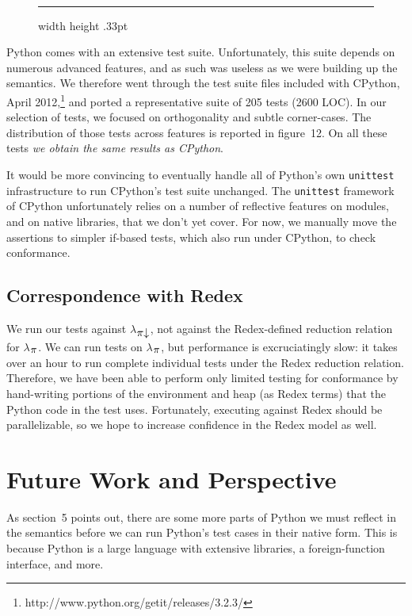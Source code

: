 \documentclass[10pt]{sigplanconf}
\newcommand{\sectionNewpage}{}
\newcommand{\ChapRef}[2]{\SecRef{#1}{#2}}
\newcommand{\SecRef}[2]{section~#1}
\newcommand{\ChapRefLocal}[3]{\ChapRef{#2}{#3}}
\newcommand{\Scribtexttt}[1]{{\texttt{#1}}}
\newcommand{\textsub}[1]{$_{\hbox{\textsmaller{#1}}}$}
\newcommand{\Larger}[1]{\textlarger{#1}}
\let\SOriginalthesubsection\thesubsection
\let\SOriginalthesubsubsection\thesubsubsection
\newcommand{\Ssection}[2]{\section[#1]{#2}\let\thesubsection\SOriginalthesubsection}
\newcommand{\Ssubsection}[2]{\subsection[#1]{#2}\let\thesubsubsection\SOriginalthesubsubsection}
\newcommand{\NoteBox}[1]{\footnote{#1}}
\newcommand{\NoteContent}[1]{#1}
\newcommand{\Legend}[1]{~

                        \hrule width \hsize height .33pt
                        \vspace{4pt}
                        \legend{#1}}
\newcommand{\FigureTarget}[2]{#1}
\newcommand{\FigureRef}[2]{#1}
\newenvironment{Figure}{\begin{figure}}{\end{figure}}
\newcommand{\Centertext}[1]{\begin{center}#1\end{center}}
\begin{document}
\begin{Figure}
\Centertext{\Legend{\FigureTarget{\label{t:x28counter_x28x22figurex22_x22fx3atestsx22x29x29}Figure~12: }{t:x28counter_x28x22figurex22_x22fx3atestsx22x29x29}Distribution of passing tests}}\end{Figure}

Python comes with an extensive test suite. Unfortunately, this suite
depends on numerous advanced features, and as such was useless as we
were building up the semantics. We therefore went through the test
suite files included with CPython, April 2012,\NoteBox{\NoteContent{http://www.python.org/getit/releases/3.2.3/}}
and ported a representative suite of 205 tests (2600 LOC).  In
our selection of tests, we focused on orthogonality and
subtle corner{-}cases. The distribution of those tests across features is reported in
figure~\FigureRef{12}{t:x28counter_x28x22figurex22_x22fx3atestsx22x29x29}.  On all these tests \textit{we obtain the
same results as CPython}.

It would be more convincing to eventually handle all of Python{'}s own
\Scribtexttt{unittest} infrastructure to run CPython{'}s test suite unchanged.  The
\Scribtexttt{unittest} framework of CPython unfortunately relies on a number of
reflective features on modules, and on native libraries, that we don{'}t yet
cover.  For now, we manually move the assertions to simpler if{-}based
tests, which also run under CPython, to check conformance.

\Ssubsection{Correspondence with Redex}{Correspondence with Redex}\label{t:x28part_x22Correspondencex5fwithx5fRedexx22x29}

We run our tests against $\lambda$\textsub{\Larger{$\pi$$\downarrow$}}, not against the Redex{-}defined
reduction relation for $\lambda$\textsub{\Larger{$\pi$}}.  We can run tests on $\lambda$\textsub{\Larger{$\pi$}}, but
performance is excruciatingly slow: it takes over an hour to run complete
individual
tests under the Redex reduction relation. Therefore, we have been able
to perform only limited testing for conformance by hand{-}writing portions
of the environment and heap (as Redex terms) that the Python code in the test
uses.  Fortunately, executing
against Redex should be parallelizable, so we hope to increase
confidence in the Redex model as well.

\sectionNewpage

\Ssection{Future Work and Perspective}{Future Work and Perspective}\label{t:x28part_x22sx3afuturex22x29}

As \ChapRefLocal{t:x28part_x22sx3aengineeringx22x29}{5}{Engineering \& Evaluation} points out, there are some more parts of Python we
must reflect in the semantics before we can run Python{'}s test
cases in their native form. This is because Python is a large language
with extensive libraries, a foreign{-}function interface, and more.
\end{document}
